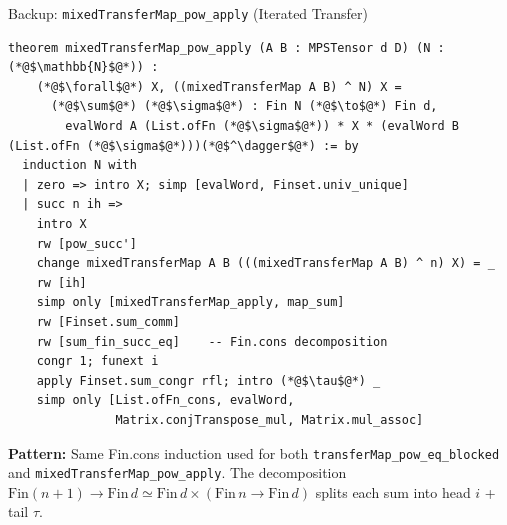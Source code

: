 \documentclass[aspectratio=169,10pt]{beamer}
\begin{document}
\begin{frame}[fragile]{Backup: \texttt{mixedTransferMap\_pow\_apply} (Iterated Transfer)}
\vspace{-0.7em}
\begin{lstlisting}[basicstyle=\ttfamily\fontsize{4.5}{5.5}\selectfont\color{white}]
theorem mixedTransferMap_pow_apply (A B : MPSTensor d D) (N : (*@$\mathbb{N}$@*)) :
    (*@$\forall$@*) X, ((mixedTransferMap A B) ^ N) X =
      (*@$\sum$@*) (*@$\sigma$@*) : Fin N (*@$\to$@*) Fin d,
        evalWord A (List.ofFn (*@$\sigma$@*)) * X * (evalWord B (List.ofFn (*@$\sigma$@*)))(*@$^\dagger$@*) := by
  induction N with
  | zero => intro X; simp [evalWord, Finset.univ_unique]
  | succ n ih =>
    intro X
    rw [pow_succ']
    change mixedTransferMap A B (((mixedTransferMap A B) ^ n) X) = _
    rw [ih]
    simp only [mixedTransferMap_apply, map_sum]
    rw [Finset.sum_comm]
    rw [sum_fin_succ_eq]    -- Fin.cons decomposition
    congr 1; funext i
    apply Finset.sum_congr rfl; intro (*@$\tau$@*) _
    simp only [List.ofFn_cons, evalWord,
               Matrix.conjTranspose_mul, Matrix.mul_assoc]
\end{lstlisting}
\vspace{0.1em}
{\small\textbf{Pattern:} Same Fin.cons induction used for both \texttt{transferMap\_pow\_eq\_blocked} and \texttt{mixedTransferMap\_pow\_apply}. The decomposition
$\mathrm{Fin}(n+1) \to \mathrm{Fin}\,d \simeq  \mathrm{Fin}\,d \times (\mathrm{Fin}\,n \to \mathrm{Fin}\,d)$
splits each sum into head $i$ + tail $\tau$.}
\end{frame}
\end{document}
